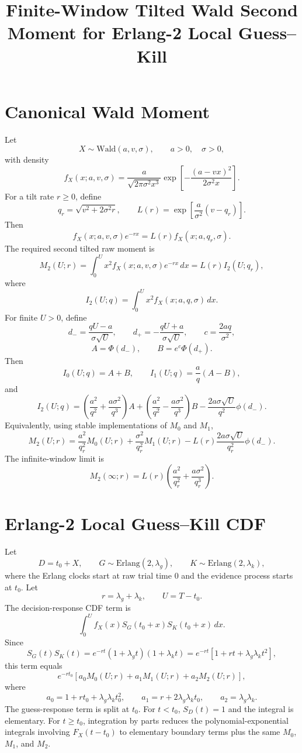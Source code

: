 \documentclass[11pt]{article}
\title{Finite-Window Tilted Wald Second Moment for Erlang-2 Local Guess--Kill}
\author{}
\date{}
\begin{document}
\maketitle

\section{Canonical Wald Moment}

Let
\[
X\sim\mathrm{Wald}(a,v,\sigma),\qquad a>0,\quad \sigma>0,
\]
with density
\[
f_X(x;a,v,\sigma)=
\frac{a}{\sqrt{2\pi\sigma^2x^3}}
\exp\left[-\frac{(a-vx)^2}{2\sigma^2x}\right].
\]
For a tilt rate $r\ge0$, define
\[
q_r=\sqrt{v^2+2\sigma^2r},
\qquad
L(r)=\exp\left[\frac{a}{\sigma^2}(v-q_r)\right].
\]
Then
\[
f_X(x;a,v,\sigma)e^{-rx}=L(r)f_X(x;a,q_r,\sigma).
\]
The required second tilted raw moment is
\[
M_2(U;r)=\int_0^U x^2f_X(x;a,v,\sigma)e^{-rx}\,dx
       =L(r)I_2(U;q_r),
\]
where
\[
I_2(U;q)=\int_0^U x^2f_X(x;a,q,\sigma)\,dx.
\]
For finite $U>0$, define
\[
d_- = \frac{qU-a}{\sigma\sqrt U},
\qquad
d_+ = -\frac{qU+a}{\sigma\sqrt U},
\qquad
c=\frac{2aq}{\sigma^2},
\]
\[
A=\Phi(d_-),
\qquad
B=e^c\Phi(d_+).
\]
Then
\[
I_0(U;q)=A+B,
\qquad
I_1(U;q)=\frac{a}{q}(A-B),
\]
and
\[
I_2(U;q)=
\left(\frac{a^2}{q^2}+\frac{a\sigma^2}{q^3}\right)A
+
\left(\frac{a^2}{q^2}-\frac{a\sigma^2}{q^3}\right)B
-
\frac{2a\sigma\sqrt U}{q^2}\phi(d_-).
\]
Equivalently, using stable implementations of $M_0$ and $M_1$,
\[
M_2(U;r)=
\frac{a^2}{q_r^2}M_0(U;r)
+
\frac{\sigma^2}{q_r^2}M_1(U;r)
-L(r)\frac{2a\sigma\sqrt U}{q_r^2}\phi(d_-).
\]
The infinite-window limit is
\[
M_2(\infty;r)=L(r)\left(\frac{a^2}{q_r^2}+\frac{a\sigma^2}{q_r^3}\right).
\]

\section{Erlang-2 Local Guess--Kill CDF}

Let
\[
D=t_0+X,
\qquad
G\sim\mathrm{Erlang}(2,\lambda_g),
\qquad
K\sim\mathrm{Erlang}(2,\lambda_k),
\]
where the Erlang clocks start at raw trial time $0$ and the evidence process starts at $t_0$. Let
\[
r=\lambda_g+\lambda_k,
\qquad
U=T-t_0.
\]
The decision-response CDF term is
\[
\int_0^U f_X(x)S_G(t_0+x)S_K(t_0+x)\,dx.
\]
Since
\[
S_G(t)S_K(t)=e^{-rt}(1+\lambda_gt)(1+\lambda_kt)
=e^{-rt}\left[1+rt+\lambda_g\lambda_kt^2\right],
\]
this term equals
\[
e^{-rt_0}\left[a_0M_0(U;r)+a_1M_1(U;r)+a_2M_2(U;r)\right],
\]
where
\[
a_0=1+rt_0+\lambda_g\lambda_kt_0^2,
\qquad
a_1=r+2\lambda_g\lambda_kt_0,
\qquad
a_2=\lambda_g\lambda_k.
\]
The guess-response term is split at $t_0$. For $t<t_0$, $S_D(t)=1$ and the integral is elementary. For $t\ge t_0$, integration by parts reduces the polynomial-exponential integrals involving $F_X(t-t_0)$ to elementary boundary terms plus the same $M_0$, $M_1$, and $M_2$.
\end{document}
